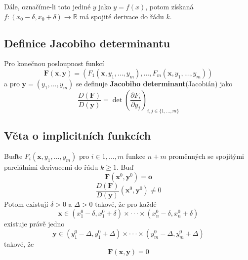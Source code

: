 \documentclass[../main.tex]{subfiles}
\begin{document}
\noindent
Dále, označíme-li toto jediné $y$ jako $y = f(x)$, potom získaná
$f: (x_0 - \delta , x_0 + \delta ) \to \mathbb{R}$ má spojité derivace do řádu $k$.




\subsection{Definice Jacobiho determinantu}
\hspace{1.2mm}
\noindent
Pro konečnou posloupnost funkcí
\[ \mathbf{F}(\mathbf{x}, \mathbf{y}) =
(F_1(\mathbf{x}, y_1, ..., y_m), ... , F_m(\mathbf{x}, y_1, ..., y_m)) \]
a pro $\mathbf{y} = (y_1, ... , y_m)$ se definuje \textbf{Jacobiho determinant}(Jacobián) jako
\[ \frac{D(\mathbf{F})}{D(\mathbf{y})} =
\det \left( \frac{\partial F_i}{\partial y_j} \right)_{i,j \in \{ 1, ... , m\}} \]

\subsection{Věta o implicitních funkcích}
\hspace{1.2mm}
\noindent
Buďte $F_i(\mathbf{x}, y_1, ... , y_m)$ pro $i \in {1, ... , m}$ funkce $n+m$ proměnných se spojitými
parciálními derivacemi do řádu $k \geq 1$. Buď \[ \mathbf{F}(\mathbf{x}^0, \mathbf{y}^0) = \mathbf{o} \]
\[ \frac{D(\mathbf{F})}{D(\mathbf{y})}(\mathbf{x}^0, \mathbf{y}^0) \neq 0 \]
Potom existují $\delta > 0$ a $\Delta > 0$ takové, že pro každé
\[ \mathbf{x} \in (x_{1}^{0} - \delta, x_{1}^{0} + \delta) \times \cdot \cdot \cdot \times 
(x_{n}^{0} - \delta, x_{n}^{0} + \delta)\]
existuje právě jedno
\[ \mathbf{y} \in (y_{1}^{0} - \Delta , y_{1}^{0} + \Delta) \times \cdot \cdot \cdot \times
(y_{m}^{0} - \Delta , y_{m}^{0} + \Delta) \]
takové, že
\[ \mathbf{F}(\mathbf{x}, \mathbf{y}) = 0 \]

\end{document}
